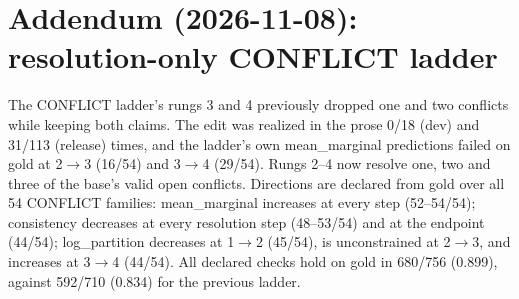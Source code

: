 \documentclass[11pt]{article}
\begin{document}
\section*{Addendum (2026-11-08): resolution-only CONFLICT ladder}
The CONFLICT ladder's rungs 3 and 4 previously dropped one and two conflicts while keeping both claims. The edit was realized in the prose 0/18 (dev) and 31/113 (release) times, and the ladder's own mean\_marginal predictions failed on gold at 2$\rightarrow$3 (16/54) and 3$\rightarrow$4 (29/54). Rungs 2--4 now resolve one, two and three of the base's valid open conflicts. Directions are declared from gold over all 54 CONFLICT families: mean\_marginal increases at every step (52--54/54); consistency decreases at every resolution step (48--53/54) and at the endpoint (44/54); log\_partition decreases at 1$\rightarrow$2 (45/54), is unconstrained at 2$\rightarrow$3, and increases at 3$\rightarrow$4 (44/54). All declared checks hold on gold in 680/756 (0.899), against 592/710 (0.834) for the previous ladder.
\end{document}
